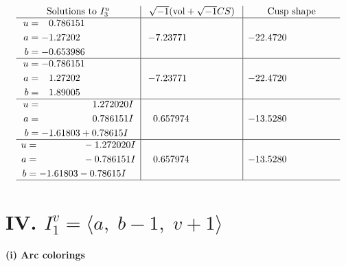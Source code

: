 \documentclass[1p]{elsarticle_modified}
\theoremstyle{definition}
\newcommand{\I}{\sqrt{-1}}
\begin{document}
$$\begin{array}{c|c|c}  
\text{Solutions to }I^u_{3}& \I (\text{vol} + \sqrt{-1}CS) & \text{Cusp shape}\\
 \hline 
\begin{aligned}
u &= \phantom{-}0.786151\phantom{ +0.000000I} \\
a &= -1.27202\phantom{ +0.000000I} \\
b &= -0.653986\phantom{ +0.000000I}\end{aligned}
 & -7.23771\phantom{ +0.000000I} & -22.4720\phantom{ +0.000000I} \\ \hline\begin{aligned}
u &= -0.786151\phantom{ +0.000000I} \\
a &= \phantom{-}1.27202\phantom{ +0.000000I} \\
b &= \phantom{-}1.89005\phantom{ +0.000000I}\end{aligned}
 & -7.23771\phantom{ +0.000000I} & -22.4720\phantom{ +0.000000I} \\ \hline\begin{aligned}
u &= \phantom{-0.000000 -}1.272020 I \\
a &= \phantom{-0.000000 -}0.786151 I \\
b &= -1.61803 + 0.78615 I\end{aligned}
 & \phantom{-}0.657974\phantom{ +0.000000I} & -13.5280\phantom{ +0.000000I} \\ \hline\begin{aligned}
u &= \phantom{-0.000000 } -1.272020 I \\
a &= \phantom{-0.000000 } -0.786151 I \\
b &= -1.61803 - 0.78615 I\end{aligned}
 & \phantom{-}0.657974\phantom{ +0.000000I} & -13.5280\phantom{ +0.000000I}\\
 \hline 
 \end{array}$$\newpage\newpage\renewcommand{\arraystretch}{1}
\centering \section*{IV. $I^v_{1}= \langle a,\;b-1,\;v+1 \rangle$}
\flushleft \textbf{(i) Arc colorings}\\
\end{document}
